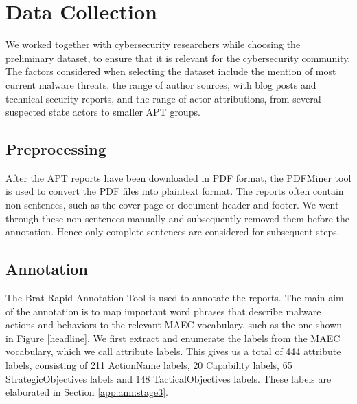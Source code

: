 \documentclass[11pt,a4paper]{article}
\begin{document}


\section{Data Collection}


We worked together with cybersecurity researchers while choosing the preliminary dataset, to ensure that it is relevant for the cybersecurity community.
The factors considered when selecting the dataset include the mention of most current malware threats, the range of author sources, with blog posts and technical security reports, and the range of actor attributions, from several suspected state actors to smaller APT groups.


\subsection{Preprocessing}



After the APT reports have been downloaded in PDF format, the PDFMiner tool \cite{Shinyama} is used to convert the PDF files into plaintext format.
The reports often contain non-sentences, such as the cover page or document header and footer. We went through these non-sentences manually and subsequently removed them before the annotation. Hence only complete sentences are considered for subsequent steps.



\subsection{Annotation}


The Brat Rapid Annotation Tool \cite{Stenetorp:12} is used to annotate the reports. The main aim of the annotation is to map important word phrases that describe malware actions and behaviors to the relevant MAEC vocabulary, such as the one shown in Figure \ref{headline}. We first extract and enumerate the labels from the MAEC vocabulary, which we call attribute labels. This gives us a total of 444 attribute labels, consisting of 211 ActionName labels, 20 Capability labels, 65 StrategicObjectives labels and 148 TacticalObjectives labels. These labels are elaborated in Section \ref{app:ann:stage3}.
\end{document}
